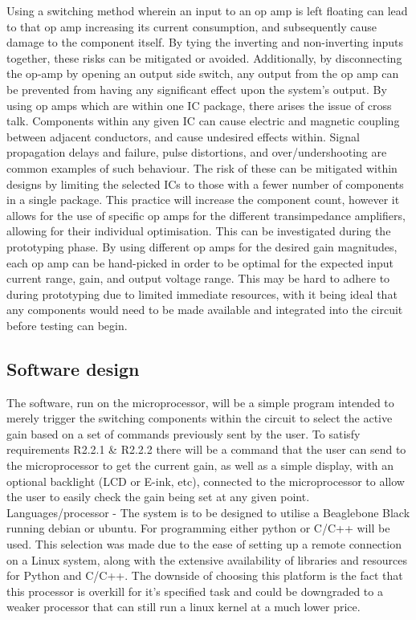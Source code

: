 \documentclass[conference]{IEEEtran}
\begin{document}
Using a switching method wherein an input to an op amp is left floating can lead to that op amp increasing its current consumption, and subsequently cause damage to the component itself. By tying the inverting and non-inverting inputs together, these risks can be mitigated or avoided. Additionally, by disconnecting the op-amp by opening an output side switch, any output from the op amp can be prevented from having any significant effect upon the system’s output.
By using op amps which are within one IC package, there arises the issue of cross talk. Components within any given IC can cause electric and magnetic coupling between adjacent conductors, and cause undesired effects within. Signal propagation delays and failure, pulse distortions, and over/undershooting are common examples of such behaviour.
The risk of these can be mitigated within designs by limiting the selected ICs to those with a fewer number of components in a single package. This practice will increase the component count, however it allows for the use of specific op amps for the different transimpedance amplifiers, allowing for their individual optimisation. This can be investigated during the prototyping phase.
By using different op amps for the desired gain magnitudes, each op amp can be hand-picked in order to be optimal for the expected input current range, gain, and output voltage range. This may be hard to adhere to during prototyping due to limited immediate resources, with it being ideal that any components would need to be made available and integrated into the circuit before testing can begin. 

\subsection{Software design}

The software, run on the microprocessor, will be a simple program intended to merely trigger the switching components within the circuit to select the active gain based on a set of commands previously sent by the user. To satisfy requirements R2.2.1 \& R2.2.2 there will be a command that the user can send to the microprocessor to get the current gain, as well as a simple display, with an optional backlight (LCD or E-ink, etc), connected to the microprocessor to allow the user to easily check the gain being set at any given point. \\

Languages/processor - The system is to be designed to utilise a Beaglebone Black running debian or ubuntu. For programming either python or C/C++ will be used. This selection was made due to the ease of setting up a remote connection on a Linux system, along with the extensive availability of libraries and resources for Python and C/C++. The downside of choosing this platform is the fact that this processor is overkill for it’s specified task and could be downgraded to a weaker processor that can still run a linux kernel at a much lower price.
\end{document}
